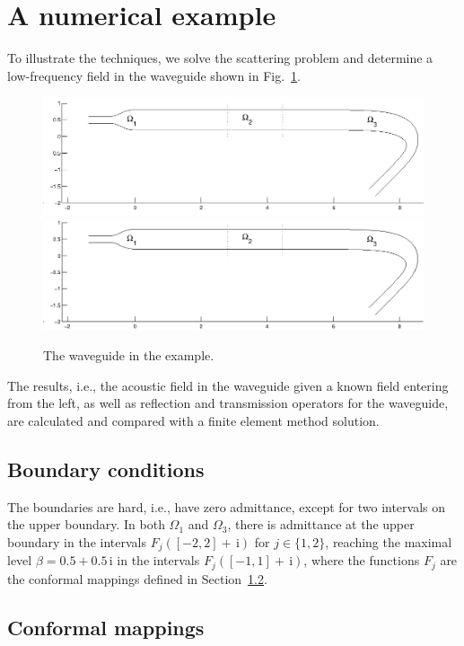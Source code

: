\documentclass[numreferences]{kluwer}
\renewcommand{\i}{\,\mathrm{i}}
\begin{document}
\section{A numerical example}
\label{sec:numerical-example}
To illustrate the techniques, we solve the scattering problem and
determine a low-frequency field in the waveguide shown in
Fig.~\ref{fig:exwg}.
\begin{figure}[htb]
  \centering \ifpdf
  \includegraphics[width=\textwidth]{waveguide.jpg}
  \else
  \includegraphics[width=\textwidth]{waveguide.eps}
  \fi
  \caption{The waveguide in the example.}
  \label{fig:exwg}
\end{figure}
The results, i.e., the acoustic field in the waveguide given a known
field entering from the left, as well as reflection and transmission
operators for the waveguide, are calculated and compared with a finite
element method solution.

\subsection{Boundary conditions}
\label{sec:boundary-conditions}


The boundaries are hard, i.e., have zero admittance, except for two
intervals on the upper boundary. In both $\Omega_1$ and $\Omega_3$,
there is admittance at the upper boundary in the intervals
$F_j([-2,2]+\i)$ for $j\in\{1,2\}$, reaching the maximal level
$\beta=0.5+0.5\i$ in the intervals $F_j([-1,1]+\i)$, where the
functions $F_j$ are the conformal mappings defined in
Section~\ref{sec:conformal-mappings}. 

\subsection{Conformal mappings}
\label{sec:conformal-mappings}
\end{document}
